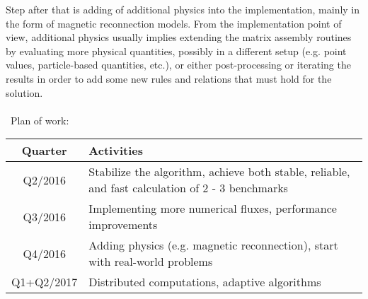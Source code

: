 Step after that is adding of additional physics into the implementation, mainly in the form of magnetic reconnection models. From the implementation point of view, additional physics usually implies extending the matrix assembly routines by evaluating more physical quantities, possibly in a different setup (e.g. point values, particle-based quantities, etc.), or either post-processing or iterating the results in order to add some new rules and relations that must hold for the solution.
\\\\\
Plan of work:
\begin{table}[h!]
	\centering
	\begin{tabular}{||c|p{5cm}||} 
		\hline
		Quarter & Activities \\
		\hline\hline
		Q2/2016 & Stabilize the algorithm, achieve both stable, reliable, and fast calculation of 2 - 3 benchmarks\\
		\hline
		Q3/2016 &  Implementing more numerical fluxes, performance improvements \\
		\hline
		Q4/2016 & Adding physics (e.g. magnetic reconnection), start with real-world problems  \\
		\hline
		Q1+Q2/2017 & Distributed computations, adaptive algorithms \\
		\hline
	\end{tabular}
\end{table}

